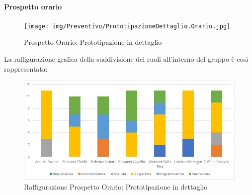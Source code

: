 \paragraph{Prospetto orario}
\begin{figure}[h!]
	\centerline{\texttt{[image: img/Preventivo/PrototipazioneDettaglio.Orario.jpg]}}
	\caption{Prospetto Orario: Prototipazione in dettaglio}
\end{figure}
La raffigurazione grafica della suddivisione dei ruoli all'interno del gruppo è così rappresentata: 
\begin{figure}[h!]
	\centerline{\includegraphics[scale=0.4]{img/Preventivo/Istogrammi/PrototipazioneDettaglio.jpg}}
	\caption{Raffigurazione Prospetto Orario: Prototipazione in dettaglio}
\end{figure}
